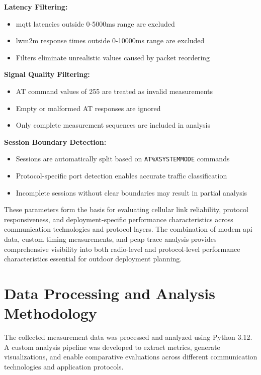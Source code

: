 \documentclass[12pt, english, openany]{book}
\begin{document}
\textbf{Latency Filtering:}
\begin{itemize}
    \item \gls{mqtt} latencies outside 0-5000ms range are excluded
    \item \gls{lwm2m} response times outside 0-10000ms range are excluded
    \item Filters eliminate unrealistic values caused by packet reordering
\end{itemize}

\textbf{Signal Quality Filtering:}
\begin{itemize}
    \item AT command values of 255 are treated as invalid measurements
    \item Empty or malformed AT responses are ignored
    \item Only complete measurement sequences are included in analysis
\end{itemize}

\textbf{Session Boundary Detection:}
\begin{itemize}
    \item Sessions are automatically split based on \texttt{AT\%XSYSTEMMODE} commands
    \item Protocol-specific port detection enables accurate traffic classification
    \item Incomplete sessions without clear boundaries may result in partial analysis
\end{itemize}

These parameters form the basis for evaluating cellular link reliability, protocol responsiveness, and deployment-specific performance characteristics across communication technologies and protocol layers. The combination of modem \gls{api} data, custom timing measurements, and \gls{pcap} trace analysis provides comprehensive visibility into both radio-level and protocol-level performance characteristics essential for outdoor deployment planning.


\section{Data Processing and Analysis Methodology} \label{sec:data_processing_and_analysis_methodology}

The collected measurement data was processed and analyzed using Python 3.12. A custom analysis pipeline was developed to extract metrics, generate visualizations, and enable comparative evaluations across different communication technologies and application protocols.
\end{document}
